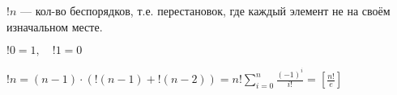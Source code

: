 $!n$ — кол-во беспорядков, т.е. перестановок, где каждый элемент не на своём изначальном месте.

$!0=1, \quad !1=0$

$!n=(n-1)\cdot(!(n-1)+!(n-2))=n!\sum\limits_{i=0}^n\frac{(-1)^i}{i!}=\left[\frac{n!}{e}\right]$
